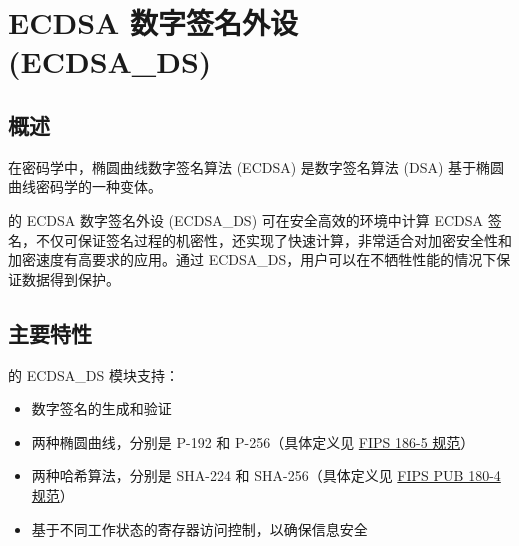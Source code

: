 \documentclass[main\_\_CN.tex]{subfiles}
\begin{document}

\ifglobal
\else
    \listoftodos
    {\let\clearpage\relax \listofdonetodos}
    \tableofcontents
\fi



\hypertarget{ecdsa}{}
\chapter{ECDSA 数字签名外设 (ECDSA\_DS)}
\label{mod:ecdsa}



\section{概述}

在密码学中，椭圆曲线数字签名算法 (ECDSA) 是数字签名算法 (DSA) 基于椭圆曲线密码学的一种变体。

\chipname{} 的 ECDSA 数字签名外设 (ECDSA\_DS) 可在安全高效的环境中计算 ECDSA 签名，不仅可保证签名过程的机密性，还实现了快速计算，非常适合对加密安全性和加密速度有高要求的应用。通过 ECDSA\_DS，用户可以在不牺牲性能的情况下保证数据得到保护。



\section{主要特性}
\label{sec:ecdsa-features}

\chipname{} 的 ECDSA\_DS 模块支持：

\begin{itemize}
    \item 数字签名的生成和验证
    \item 两种椭圆曲线，分别是 P-192 和 P-256（具体定义见 \href{https://nvlpubs.nist.gov/nistpubs/FIPS/NIST.FIPS.186-5.pdf}{FIPS 186-5 规范}）
    \item 两种哈希算法，分别是 SHA-224 和 SHA-256（具体定义见 \href{https://doi.org/10.6028/NIST.FIPS.180-4}{FIPS PUB 180-4 规范}）
    \item 基于不同工作状态的寄存器访问控制，以确保信息安全
\end{itemize}
\end{document}
